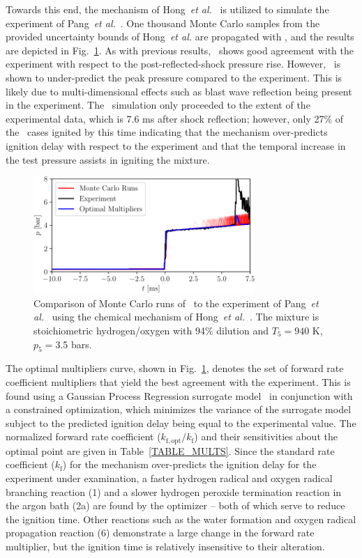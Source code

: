 Towards this end, the mechanism of Hong~\emph{et al.}~\cite{HONG_DAVIDSON_HANSON_CF11} is utilized to simulate the experiment of Pang~\emph{et al.}~\cite{PANG_DAVIDSON_HANSON_PCI32}. One thousand Monte Carlo samples from the provided uncertainty bounds of Hong~\emph{et al.} are propagated with \stnshk, and the results are depicted in Fig.~\ref{FIG_PTUQ}. As with previous results, \stnshk\ shows good agreement with the experiment with respect to the post-reflected-shock pressure rise.  However, \stnshk\ is shown to under-predict the peak pressure compared to the experiment. This is likely due to multi-dimensional effects such as blast wave reflection being present in the experiment. The \stnshk\ simulation only proceeded to the extent of the experimental data, which is 7.6 ms after shock reflection; however, only 27\% of the \stnshk\ cases ignited by this time indicating that the mechanism over-predicts ignition delay with respect to the experiment and that the temporal increase in the test pressure assists in igniting the mixture.
\begin{figure}[!ht!]
	\centering
	\includegraphics[width=84mm]{pressureTraceUQ}
	\caption{\label{FIG_PTUQ} Comparison of Monte Carlo runs of \stnshk\ to the experiment of Pang~\emph{et al.}~\cite{PANG_DAVIDSON_HANSON_PCI32} using the chemical mechanism of Hong~\emph{et al.}~\cite{HONG_DAVIDSON_HANSON_CF11}. The mixture is stoichiometric hydrogen/oxygen with 94\% dilution and $T_5=940$ K, $p_5=$3.5 bars.} 
\end{figure}
The optimal multipliers curve, shown in Fig.~\ref{FIG_PTUQ}, denotes the set of forward rate coefficient multipliers that yield the best agreement with the experiment. This is found using a Gaussian Process Regression surrogate model~\cite{SANTER_BOOK} in conjunction with a constrained optimization, which minimizes the variance of the surrogate model subject to the predicted ignition delay being equal to the experimental value. The normalized forward rate coefficient ($k_\mathrm{f,opt}/k_\mathrm{f}$) and their sensitivities about the optimal point are given in Table~\ref{TABLE_MULTS}. Since the standard rate coefficient ($k_\mathrm{f}$) for the mechanism over-predicts the ignition delay for the experiment under examination, a faster hydrogen radical and oxygen radical branching reaction (1) and a slower hydrogen peroxide termination reaction in the argon bath (2a) are found by the optimizer -- both of which serve to reduce the ignition time. Other reactions such as the water formation and oxygen radical propagation reaction (6) demonstrate a large change in the forward rate multiplier, but the ignition time is relatively insensitive to their alteration. 
